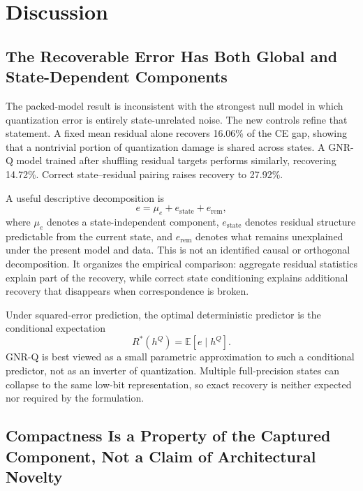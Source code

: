 \documentclass[11pt]{article}
\begin{document}
\section{Discussion}

\subsection{The Recoverable Error Has Both Global and State-Dependent Components}

The packed-model result is inconsistent with the strongest null model in which quantization error is entirely state-unrelated noise. The new controls refine that statement. A fixed mean residual alone recovers 16.06\% of the CE gap, showing that a nontrivial portion of quantization damage is shared across states. A GNR-Q model trained after shuffling residual targets performs similarly, recovering 14.72\%. Correct state--residual pairing raises recovery to 27.92\%.

A useful descriptive decomposition is
\begin{equation}
 e = \mu_e + e_{\mathrm{state}} + e_{\mathrm{rem}},
\end{equation}
where $\mu_e$ denotes a state-independent component, $e_{\mathrm{state}}$ denotes residual structure predictable from the current state, and $e_{\mathrm{rem}}$ denotes what remains unexplained under the present model and data. This is not an identified causal or orthogonal decomposition. It organizes the empirical comparison: aggregate residual statistics explain part of the recovery, while correct state conditioning explains additional recovery that disappears when correspondence is broken.

Under squared-error prediction, the optimal deterministic predictor is the conditional expectation
\begin{equation}
 R^*(h^Q)=\mathbb{E}[e\mid h^Q].
\end{equation}
GNR-Q is best viewed as a small parametric approximation to such a conditional predictor, not as an inverter of quantization. Multiple full-precision states can collapse to the same low-bit representation, so exact recovery is neither expected nor required by the formulation.

\subsection{Compactness Is a Property of the Captured Component, Not a Claim of Architectural Novelty}
\end{document}
